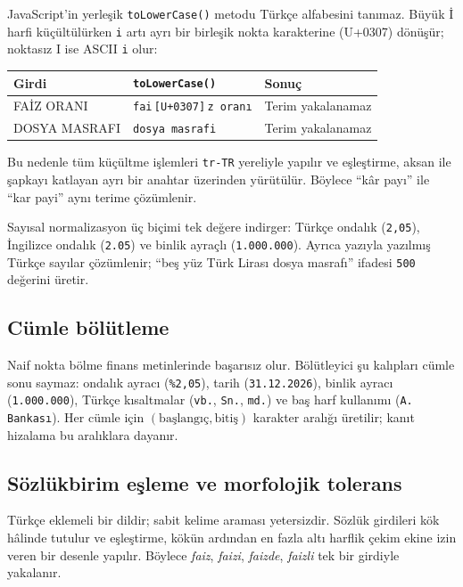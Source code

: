 \documentclass[11pt,a4paper]{article}
\begin{document}
JavaScript'in yerleşik \texttt{toLowerCase()} metodu Türkçe alfabesini
tanımaz. Büyük İ harfi küçültülürken \texttt{i} artı ayrı bir birleşik nokta
karakterine (U+0307) dönüşür; noktasız I ise ASCII \texttt{i} olur:

\begin{center}
\begin{tabular}{lll}
\toprule
\textbf{Girdi} & \textbf{\texttt{toLowerCase()}} & \textbf{Sonuç} \\
\midrule
FAİZ ORANI & \texttt{fai}\,\textcolor{eksik}{\texttt{[U+0307]}}\,\texttt{z oranı} & Terim yakalanamaz \\
DOSYA MASRAFI & \texttt{dosya masraf}\textcolor{eksik}{\texttt{i}} & Terim yakalanamaz \\
\bottomrule
\end{tabular}
\end{center}

Bu nedenle tüm küçültme işlemleri \texttt{tr-TR} yereliyle yapılır ve
eşleştirme, aksan ile şapkayı katlayan ayrı bir anahtar üzerinden yürütülür.
Böylece ``kâr payı'' ile ``kar payi'' aynı terime çözümlenir.

Sayısal normalizasyon üç biçimi tek değere indirger: Türkçe ondalık
(\texttt{2,05}), İngilizce ondalık (\texttt{2.05}) ve binlik ayraçlı
(\texttt{1.000.000}). Ayrıca yazıyla yazılmış Türkçe sayılar çözümlenir;
``beş yüz Türk Lirası dosya masrafı'' ifadesi \texttt{500} değerini üretir.

\subsection{Cümle bölütleme}

Naif nokta bölme finans metinlerinde başarısız olur. Bölütleyici şu kalıpları
cümle sonu saymaz: ondalık ayracı (\texttt{\%2,05}), tarih
(\texttt{31.12.2026}), binlik ayracı (\texttt{1.000.000}), Türkçe kısaltmalar
(\texttt{vb.}, \texttt{Sn.}, \texttt{md.}) ve baş harf kullanımı
(\texttt{A. Bankası}). Her cümle için \((\text{başlangıç}, \text{bitiş})\)
karakter aralığı üretilir; kanıt hizalama bu aralıklara dayanır.

\subsection{Sözlükbirim eşleme ve morfolojik tolerans}

Türkçe eklemeli bir dildir; sabit kelime araması yetersizdir. Sözlük
girdileri kök hâlinde tutulur ve eşleştirme, kökün ardından en fazla altı
harflik çekim ekine izin veren bir desenle yapılır. Böylece \emph{faiz},
\emph{faizi}, \emph{faizde}, \emph{faizli} tek bir girdiyle yakalanır.
\end{document}
